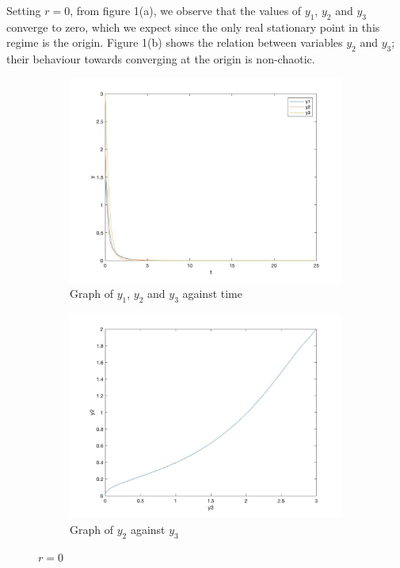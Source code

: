 \documentclass[a4paper,11pt]{article}
\begin{document}
Setting $r=0$, from figure 1(a), we observe that the values of $y_{1}$, $y_{2}$ and $y_{3}$ converge to zero, which we expect since the only real stationary point in this regime is the origin. Figure 1(b) shows the relation between variables $y_{2}$ and $y_{3}$; their behaviour towards converging at the origin is non-chaotic.





    
\begin{figure}
     \centering
     \begin{subfigure}[b]{0.45\textwidth}
         \centering
         \includegraphics[width=\textwidth]{r0_y123_time}
         \caption{Graph of $y_{1}$, $y_{2}$ and $y_{3}$ against time}
         \label{fig:y equals x}
     \end{subfigure}
     \hfill
     \begin{subfigure}[b]{0.45\textwidth}
         \centering
         \includegraphics[width=\textwidth]{r0_y2_y3}
         \caption{Graph of $y_{2}$ against $y_{3}$}
         \label{fig:three sin x}
     \end{subfigure}
        \caption{$r=0$}
        \label{fig:r=0}
\end{figure}
\end{document}

